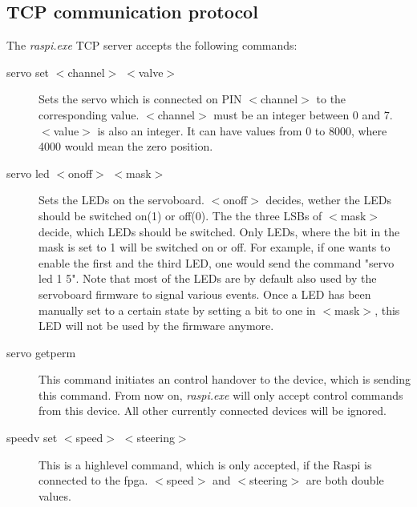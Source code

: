 \documentclass[12pt]{article}
\begin{document}
\subsection{TCP communication protocol}
The \textit{raspi.exe} TCP server accepts the following commands:
\begin{description}
\item[servo set $<$channel$>$ $<$valve$>$] Sets the servo which is connected on PIN $<$channel$>$ to the corresponding value. $<$channel$>$ must be an integer between 0 and 7. $<$value$>$ is also an integer. It can have values from 0 to 8000, where 4000 would mean the zero position.
\item[servo led $<$onoff$>$ $<$mask$>$] Sets the LEDs on the servoboard. $<$onoff$>$ decides, wether the LEDs should be switched on(1) or off(0). The the three LSBs of $<$mask$>$ decide, which LEDs should be switched. Only LEDs, where the bit in the mask is set to 1 will be switched on or off. For example, if one wants to enable the first and the third LED, one would send the command "servo led 1 5". Note that most of the LEDs are by default also used by the servoboard firmware to signal various events. Once a LED has been manually set to a certain state by setting a bit to one in $<$mask$>$, this LED will not be used by the firmware anymore.
\item[servo getperm] This command initiates an control handover to the device, which is sending this command. From now on, \textit{raspi.exe} will only accept control commands from this device. All other currently connected devices will be ignored.
\item[speedv set $<$speed$>$ $<$steering$>$] This is a highlevel command, which is only accepted, if the Raspi is connected to the fpga. $<$speed$>$ and $<$steering$>$ are both double values.
\end{description}
\end{document}
